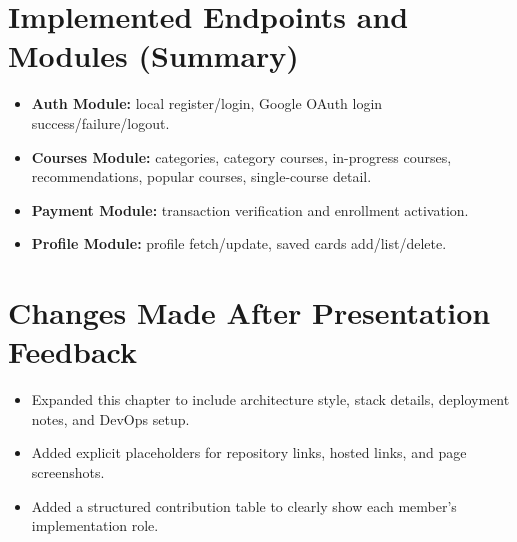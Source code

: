\documentclass[12pt,a4paper]{report}
\begin{document}
\section{Implemented Endpoints and Modules (Summary)}
\begin{itemize}[leftmargin=*]
  \item \textbf{Auth Module:} local register/login, Google OAuth login success/failure/logout.
  \item \textbf{Courses Module:} categories, category courses, in-progress courses, recommendations, popular courses, single-course detail.
  \item \textbf{Payment Module:} transaction verification and enrollment activation.
  \item \textbf{Profile Module:} profile fetch/update, saved cards add/list/delete.
\end{itemize}

\section{Changes Made After Presentation Feedback}
\begin{itemize}[leftmargin=*]
  \item Expanded this chapter to include architecture style, stack details, deployment notes, and DevOps setup.
  \item Added explicit placeholders for repository links, hosted links, and page screenshots.
  \item Added a structured contribution table to clearly show each member's implementation role.
\end{itemize}
\end{document}
